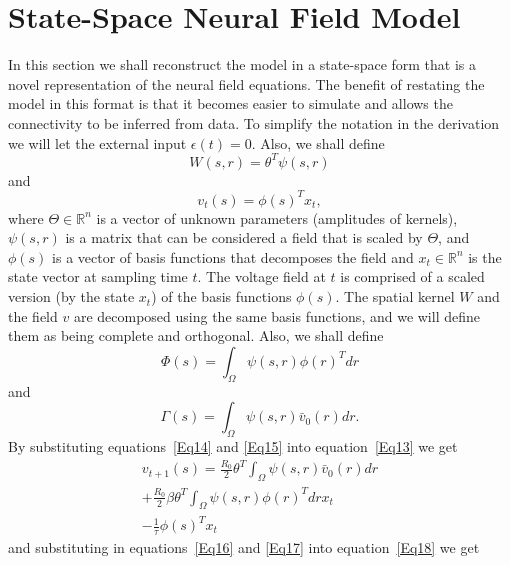 \documentclass[onecolumn,draftcls]{IEEEtran}
\begin{document}
\section{State-Space Neural Field Model}
In this section we shall reconstruct the model in a state-space form that is a novel representation of the neural field equations. The benefit of restating the model in this format is that it becomes easier to simulate and allows the connectivity to be inferred from data. To simplify the notation in the derivation we will let the external input $\epsilon(t)=0$. Also, we shall define
\begin{equation}\label{Eq14}
W\left( {s,r} \right) = {\theta ^T}\psi \left( {s,r} \right)
\end{equation}
and
\begin{equation}\label{Eq15}
{v_t}\left( s \right) = \phi {\left( s \right)^T}{x_t},
\end{equation}
where $\Theta \in \mathbb{R}^n$ is a vector of unknown parameters (amplitudes of kernels), $\psi(s,r)$ is a matrix that can be considered a field that is scaled by $\Theta$, and $\phi(s)$ is a vector of basis functions that decomposes the field and $x_t \in\mathbb{R}^n$ is the state vector at sampling time $t$. The voltage field at $t$ is comprised of a scaled version (by the state $x_t$) of the basis functions $\phi(s)$.
 The spatial kernel $W$ and the field $v$ are decomposed using the same basis functions, and we will define them as being complete and orthogonal. Also, we shall define
\begin{equation}\label{Eq16}
\Phi \left( s \right) = \int_\Omega  {\psi \left( {s,r} \right)\phi {{\left( r \right)}^T}dr}
\end{equation}
and
\begin{equation}\label{Eq17}
\Gamma \left( s \right) = \int_\Omega  {\psi \left( {s,r} \right){{\bar v}_0}\left( r \right)dr}.
\end{equation}
By substituting equations~\ref{Eq14} and \ref{Eq15} into equation~\ref{Eq13} we get
\begin{align}\label{Eq18}
 {v_{t + 1}}\left( s \right) = \frac{{{R_0}}}{2}{\theta ^T}\int_\Omega  {\psi \left( {s,r} \right){{\bar v}_0}\left( r \right)dr} \nonumber \\
  + \frac{{{R_0}}}{2}\beta {\theta ^T}\int_\Omega  {\psi \left( {s,r} \right)\phi {{\left( r \right)}^T}dr} {x_t} \\
  - \frac{1}{\tau }\phi {\left( s \right)^T}{x_t} \nonumber
\end{align}
and substituting in equations~\ref{Eq16} and \ref{Eq17} into equation~\ref{Eq18} we get
\end{document}
